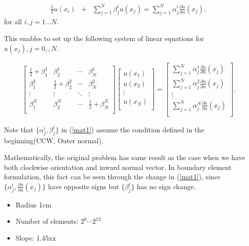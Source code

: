 \begin{eqnarray}
\frac{1}{2} u(x_i) &+& \sum_{j=1}^N \beta_j^iu(x_j) = \sum_{j=1}^N
\alpha^i_j\frac{\partial u}{\partial n}(x_j),
\end{eqnarray}
for all $i,j = 1 \dots N$.

This enables to set up the following system of linear equations
for $u(x_j), j = 0, \dot, N$.

\begin{eqnarray}
\label{mat1}
\begin{bmatrix}
    \frac{1}{2}+\beta^1_1& \beta^1_2& \cdots & \beta^1_N \\
    \beta^2_1& \frac{1}{2}+\beta^2_2& \cdots & \beta^2_N\\
    \vdots& \vdots& \ddots& \vdots\\
    \beta^N_1& \beta^N_2& \cdots & \frac{1}{2} + \beta^N_N \\
\end{bmatrix}
\begin{bmatrix}
    u(x_1)    \\
    u(x_2)    \\
    \vdots      \\
    u(x_N)    \\
\end{bmatrix}
=
\begin{bmatrix}
    \sum_{j=1}^N \alpha^1_j\frac{\partial u}{\partial n}(x_j)   \\
    \sum_{j=1}^N \alpha^2_j\frac{\partial u}{\partial n}(x_j)   \\
    \vdots  \\
    \sum_{j=1}^N \alpha^N_j\frac{\partial u}{\partial n}(x_j)   \\
\end{bmatrix}.
\end{eqnarray}

Note that $\{\alpha^i_j, \beta^i_j\}$ in  (\ref{mat1}) assume the
condition defined in the beginning(CCW, Outer normal).

Mathematically, the original problem has same result as the case
when we have both clockwise orientation and inward normal vector.
In boundary element formulation, this fact can be seen through the
change in (\ref{mat1}), since $\{\alpha^i_j, \frac{\partial
u}{\partial n}(x_j)\}$ have opposite signs but $\{\beta^i_j\}$ has
no sign change.

\begin{itemize}
\item Radius 1cm
\item Number of elements: $2^6 \cdots 2^{12}$
\item Slope: 1.45xx
\end{itemize}

